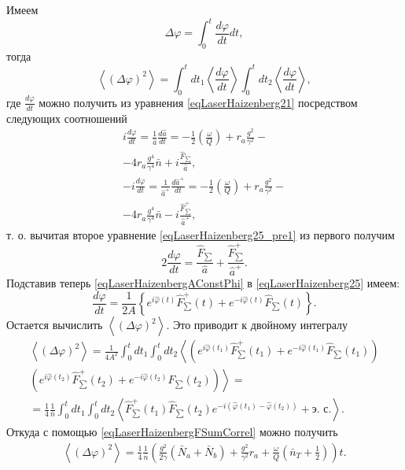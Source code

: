 Имеем
\[
\Delta \varphi = \int_0^t \frac{d \varphi}{d t}dt,
\]
тогда
\[
\left<\left(\Delta \varphi\right)^2\right> = \int_0^t d t_1 \left<\frac{d \varphi}{d t}\right>
\int_0^{t} d t_2 \left<\frac{d \varphi}{d t}\right>,
\]
где $\frac{d \varphi}{d t}$ можно получить из уравнения
\eqref{eqLaserHaizenberg21} посредством следующих соотношений
\begin{eqnarray}
i \frac{d \varphi}{d t} = \frac{1}{\hat{a}}\frac{d
  \hat{a}}{d t} = 
-\frac{1}{2}\left(\frac{\omega}{Q}\right)
+ r_a \frac{g^2}{\gamma^2} - 
\nonumber \\
- 4 r_a\frac{g^4}{\gamma^4} \bar{n} + i \frac{\hat{F}_{\sum}}{\hat{a}},
\nonumber \\
- i \frac{d \varphi}{d t} = \frac{1}{\hat{a}^{+}}\frac{d
  \hat{a}^{+}}{d t} = 
-\frac{1}{2}\left(\frac{\omega}{Q}\right)
+ r_a \frac{g^2}{\gamma^2} - 
\nonumber \\
- 4 r_a\frac{g^4}{\gamma^4} \bar{n} - i \frac{\hat{F}^{+}_{\sum}}{\hat{a}^{+}},
\label{eqLaserHaizenberg25_pre1}
\end{eqnarray}
т. о. вычитая второе уравнение \eqref{eqLaserHaizenberg25_pre1} из
первого получим
\begin{equation}
2 \frac{d \varphi}{d t} = 
\frac{\hat{F}_{\sum}}{\hat{a}} + \frac{\hat{F}^{+}_{\sum}}{\hat{a}^{+}}.
\label{eqLaserHaizenberg25}
\end{equation}
Подставив теперь \eqref{eqLaserHaizenbergAConstPhi} в
\eqref{eqLaserHaizenberg25} 
имеем:
\begin{equation}
\frac{d \varphi}{d t} = \frac{1}{2 A}
\left\{
e^{i\hat{\varphi}\left(t\right)}\hat{F}^{+}_{\sum}\left(t\right) +
e^{- i\hat{\varphi}\left(t\right)}\hat{F}_{\sum}\left(t\right)
\right\}.
\nonumber
\end{equation}
Остается вычислить  
\(
\left<\left(\Delta \varphi\right)^2\right>.
\)
Это приводит к двойному интегралу
\begin{eqnarray}
\left<\left(\Delta \varphi\right)^2\right> = 
\frac{1}{4 A^2}
\int_0^t d t_1 
\int_0^t d t_2
\left<
\left(
e^{i\hat{\varphi}\left(t_1\right)}\hat{F}^{+}_{\sum}\left(t_1\right) + 
e^{- i\hat{\varphi}\left(t_1\right)}\hat{F}_{\sum}\left(t_1\right)
\right)\right.
\nonumber \\
\left.
\left(
e^{i\hat{\varphi}\left(t_2\right)}\hat{F}^{+}_{\sum}\left(t_2\right) +
e^{- i\hat{\varphi}\left(t_2\right)}\hat{F}_{\sum}\left(t_2\right)
\right)
\right> = 
\nonumber \\
=
\frac{1}{4}\frac{1}{\bar{n}}
\int_0^t d t_1 
\int_0^t d t_2
\left<
\hat{F}^{+}_{\sum}\left(t_1\right)\hat{F}_{\sum}\left(t_2\right)e^{-i\left(
\hat{\varphi}\left(t_1\right) - \hat{\varphi}\left(t_2\right)
\right)} + \mbox{э. с.}\right>.
\nonumber
\end{eqnarray}
Откуда с помощью \eqref{eqLaserHaizenbergFSumCorrel} можно получить
\begin{eqnarray}
\left<\left(\Delta \varphi\right)^2\right> = 
\frac{1}{4}\frac{1}{\bar{n}}
\left(
\frac{g^2}{2\gamma}\left(\bar{N}_a + \bar{N}_b\right) + \frac{g^2}{\gamma^2}r_a + 
\frac{\omega}{Q}\left(\bar{n}_T + \frac{1}{2}\right)
\right) t.
\label{eqLaserHaizenbergTaskDelta}
\end{eqnarray}


